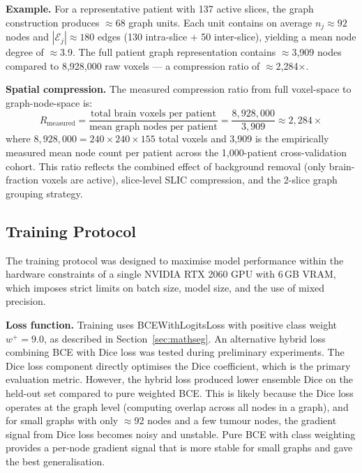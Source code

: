 \documentclass{article}
\begin{document}
\textbf{Example.} For a representative patient with 137 active slices, the graph
construction produces $\approx$68 graph units. Each unit contains on average
$n_j \approx 92$ nodes and $|\mathcal{E}_j| \approx 180$ edges (130 intra-slice
+ 50 inter-slice), yielding a mean node degree of $\approx$3.9. The full patient
graph representation contains $\approx$3,909 nodes compared to 8,928,000 raw
voxels --- a compression ratio of $\approx$2,284$\times$.

\textbf{Spatial compression.} The measured compression ratio from full voxel-space
to graph-node-space is:
\begin{equation}
    R_{\text{measured}} = \frac{\text{total brain voxels per patient}}
    {\text{mean graph nodes per patient}}
    = \frac{8{,}928{,}000}{3{,}909} \approx 2{,}284\times
    \label{eq:compression}
\end{equation}
where $8{,}928{,}000 = 240 \times 240 \times 155$ total voxels and 3,909 is the
empirically measured mean node count per patient across the 1,000-patient
cross-validation cohort. This ratio reflects the combined effect of background
removal (only brain-fraction voxels are active), slice-level SLIC compression, and
the 2-slice graph grouping strategy.

\subsection{Training Protocol}
\label{sec:training}

The training protocol was designed to maximise model performance within the
hardware constraints of a single NVIDIA RTX 2060 GPU with 6\,GB VRAM, which
imposes strict limits on batch size, model size, and the use of mixed precision.

\textbf{Loss function.}
Training uses BCEWithLogitsLoss with positive class weight $w^+ = 9.0$, as
described in Section~\ref{sec:mathseg}. An alternative hybrid loss combining
BCE with Dice loss was tested during preliminary experiments. The Dice loss
component directly optimises the Dice coefficient, which is the primary
evaluation metric. However, the hybrid loss produced lower ensemble Dice on
the held-out set compared to pure weighted BCE. This is likely because the
Dice loss operates at the graph level (computing overlap across all nodes in a
graph), and for small graphs with only $\approx$92 nodes and a few tumour
nodes, the gradient signal from Dice loss becomes noisy and unstable. Pure BCE
with class weighting provides a per-node gradient signal that is more stable
for small graphs and gave the best generalisation.
\end{document}
